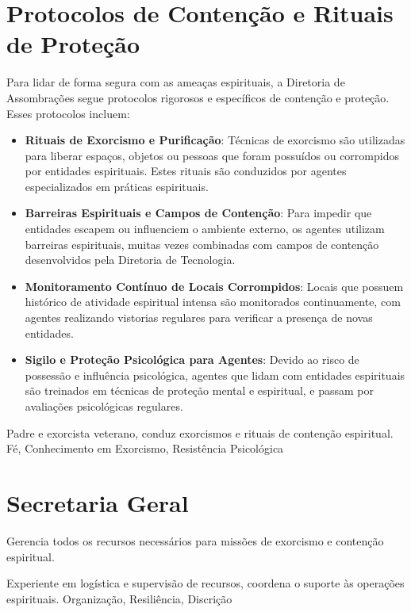 \section{Protocolos de Contenção e Rituais de Proteção}
Para lidar de forma segura com as ameaças espirituais, a Diretoria de Assombrações segue protocolos rigorosos e específicos de contenção e proteção. Esses protocolos incluem:

\begin{itemize}
    \item \textbf{Rituais de Exorcismo e Purificação}: Técnicas de exorcismo são utilizadas para liberar espaços, objetos ou pessoas que foram possuídos ou corrompidos por entidades espirituais. Estes rituais são conduzidos por agentes especializados em práticas espirituais.
    \item \textbf{Barreiras Espirituais e Campos de Contenção}: Para impedir que entidades escapem ou influenciem o ambiente externo, os agentes utilizam barreiras espirituais, muitas vezes combinadas com campos de contenção desenvolvidos pela Diretoria de Tecnologia.
    \item \textbf{Monitoramento Contínuo de Locais Corrompidos}: Locais que possuem histórico de atividade espiritual intensa são monitorados continuamente, com agentes realizando vistorias regulares para verificar a presença de novas entidades.
    \item \textbf{Sigilo e Proteção Psicológica para Agentes}: Devido ao risco de possessão e influência psicológica, agentes que lidam com entidades espirituais são treinados em técnicas de proteção mental e espiritual, e passam por avaliações psicológicas regulares.
\end{itemize}






{Padre e exorcista veterano, conduz exorcismos e rituais de contenção espiritual.}
{Fé, Conhecimento em Exorcismo, Resistência Psicológica}

\section{Secretaria Geral}
Gerencia todos os recursos necessários para missões de exorcismo e contenção espiritual.

{Experiente em logística e supervisão de recursos, coordena o suporte às operações espirituais.}
{Organização, Resiliência, Discrição}

